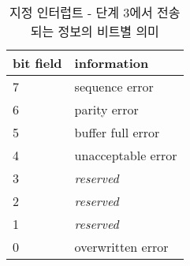 %
%
\begin{table}[htbp]
\caption{지정 인터럽트 - 단계 3에서 전송되는 정보의 비트별 의미}\label{table:dir-int-p3}
   \begin{center}
   \begin{tabular}{|l|l|} \hline
	bit field & information \\
\hline \hline
	7 & sequence error \\
	6 & parity error \\
	5 & buffer full error \\
	4 & unacceptable error \\
	3 & {\it reserved} \\
	2 & {\it reserved} \\
	1 & {\it reserved} \\
	0 & overwritten error \\
\hline
   \end{tabular}
   \end{center}
\end{table}
%
%
